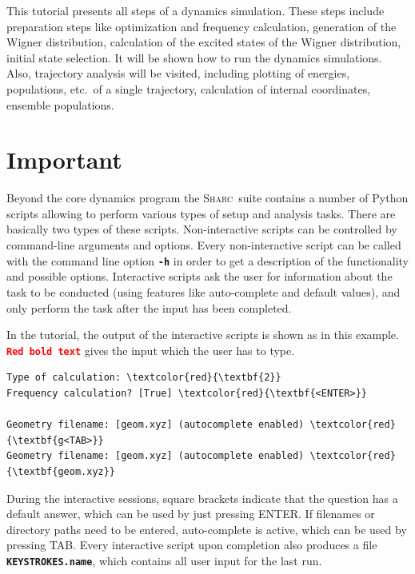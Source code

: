 \documentclass[a4paper,11pt,DIV=15,openany]{scrbook}
\newcommand{\sharc}{\textsc{Sharc}}
\newcommand{\ttt}[1]{\textbf{\texttt{#1}}}
\begin{document}
This tutorial presents all steps of a dynamics simulation. These steps include preparation steps like optimization and frequency calculation, generation of the Wigner distribution, calculation of the excited states of the Wigner distribution, initial state selection. It will be shown how to run the dynamics simulations. Also, trajectory analysis will be visited, including plotting of energies, populations, etc.\ of a single trajectory, calculation of internal coordinates, ensemble populations.


\section{Important}

Beyond the core dynamics program the \sharc\ suite contains a number of Python scripts allowing to perform various types of setup and analysis tasks. 
There are basically two types of these scripts.
Non-interactive scripts can be controlled by command-line arguments and options. Every non-interactive script can be called with the command line option \ttt{-h} in order to get a description of the functionality and possible options.
Interactive scripts ask the user for information about the task to be conducted (using features like auto-complete and default values), and only perform the task after the input has been completed. 

In the tutorial, the output of the interactive scripts is shown as in this example. 
\texttt{\textcolor{red}{\textbf{Red bold text}}} gives the input which the user has to type. 
\begin{oframed}
\footnotesize\begin{Verbatim}[commandchars=\\\{\}]
Type of calculation: \textcolor{red}{\textbf{2}}
Frequency calculation? [True] \textcolor{red}{\textbf{<ENTER>}}

Geometry filename: [geom.xyz] (autocomplete enabled) \textcolor{red}{\textbf{g<TAB>}}
Geometry filename: [geom.xyz] (autocomplete enabled) \textcolor{red}{\textbf{geom.xyz}}
\end{Verbatim}
\end{oframed}

\normalsize
During the interactive sessions, square brackets indicate that the question has a default answer, which can be used by just pressing ENTER. If filenames or directory paths need to be entered, auto-complete is active, which can be used by pressing TAB. Every interactive script upon completion also produces a file \ttt{KEYSTROKES.name}, which contains all user input for the last run.
\end{document}
